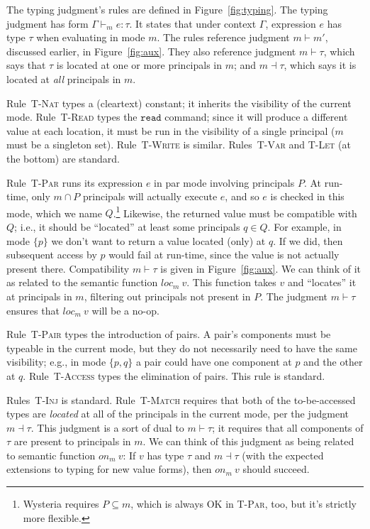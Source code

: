 \documentclass[10pt]{article}
\newcommand{\rulelab}[1]{{\small \textsc{#1}}}
\newcommand{\kw}[1]{\ensuremath{\mathtt{#1}}}
\newcommand{\hastyp}[4]{\ensuremath{{#1} \vdash_{#2} {#3} : {#4}}}
\newcommand{\locof}[2]{\ensuremath{\mathit{loc}_{#1}~{#2}}}
\newcommand{\getat}[2]{\ensuremath{\mathit{on}_{#1}~{#2}}}
\begin{document}
The typing judgment's rules are defined in Figure~\ref{fig:typing}.
The typing judgment has form $\hastyp{\Gamma}{m}{e}{\tau}$. It states
that under context $\Gamma$, expression $e$ has type $\tau$ when
evaluating in mode $m$. The rules reference judgment $m \vdash m'$,
discussed earlier, in Figure~\ref{fig:aux}. They also reference
judgment $m \vdash \tau$, which says that $\tau$ is located at 
one or more principals in $m$; and $m \dashv \tau$, which says it is
located at \emph{all} principals in $m$. 

Rule~\rulelab{T-Nat} types a (cleartext) constant; it inherits the
visibility of the current mode. Rule~\rulelab{T-Read} types the
\kw{read} command; since it will produce a different value at each
location, it must be run in the visibility of a single principal ($m$
must be a singleton set). Rule~\rulelab{T-Write} is
similar. Rules~\rulelab{T-Var} and \rulelab{T-Let} (at the bottom) are standard.

Rule~\rulelab{T-Par} runs its expression $e$ in par
mode involving principals $P$. At run-time, only $m \cap P$ principals
will actually execute $e$, and so $e$ is checked in this mode, which
we name $Q$.\footnote{Wysteria requires $P \subseteq m$, which is
  always OK in \rulelab{T-Par}, too, but it's strictly more flexible.}
Likewise, the returned value must be compatible with $Q$;
i.e., it should be ``located'' at least some principals $q \in Q$.
For example, in mode $\{p\}$ we don't want to return a value located
(only) at $q$. If we did, then subsequent access by $p$ would fail at
run-time, since the value is not actually present there.
%
Compatibility $m \vdash \tau$ is given in Figure~\ref{fig:aux}. We can
think of it as related to the semantic function $\locof{m}{v}$. This
function takes $v$ and ``locates'' it at principals in $m$, filtering
out principals not present in $P$. The judgment $m \vdash \tau$
ensures that $\locof{m}{v}$ will be a no-op.

Rule~\rulelab{T-Pair} types the introduction of pairs. A pair's
components must be typeable in the current mode, but they do not
necessarily need to have the same visibility; e.g., in mode $\{p,q\}$
a pair could have one component at $p$ and the other at
$q$. Rule~\rulelab{T-Access} types the elimination of pairs. This rule
is standard.

Rules~\rulelab{T-Inj} is standard. Rule~\rulelab{T-Match} requires
that both of the to-be-accessed types are \emph{located} at all of the
principals in the current mode, per the judgment $m \dashv \tau$. This
judgment is a sort of dual to $m \vdash \tau$; it requires that all
components of $\tau$ are present to principals in $m$. We can think of
this judgment as being related to semantic function $\getat{m}{v}$: If $v$
has type $\tau$ and $m \dashv \tau$ (with the expected extensions to
typing for new value forms), then $\getat{m}{v}$ should succeed.
\end{document}
